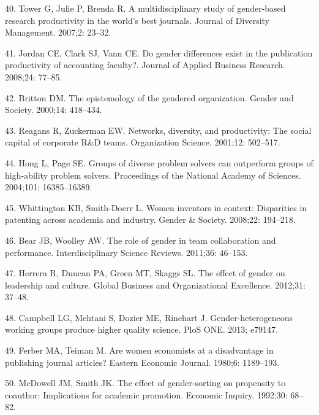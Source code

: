 \documentclass[12pt,]{article}
\begin{document}
\leavevmode\hypertarget{ref-Tower_2007}{}%
40. Tower G, Julie P, Brenda R. A multidisciplinary study of
gender-based research productivity in the world's best journals. Journal
of Diversity Management. 2007;2: 23--32.

\leavevmode\hypertarget{ref-Jordan_2008}{}%
41. Jordan CE, Clark SJ, Vann CE. Do gender differences exist in the
publication productivity of accounting faculty?. Journal of Applied
Business Research. 2008;24: 77--85.

\leavevmode\hypertarget{ref-Britton_2000}{}%
42. Britton DM. The epistemology of the gendered organization. Gender
and Society. 2000;14: 418--434.

\leavevmode\hypertarget{ref-Reagans_2001}{}%
43. Reagans R, Zuckerman EW. Networks, diversity, and productivity: The
social capital of corporate R\&D teams. Organization Science. 2001;12:
502--517.

\leavevmode\hypertarget{ref-Hong_2004}{}%
44. Hong L, Page SE. Groups of diverse problem solvers can outperform
groups of high-ability problem solvers. Proceedings of the National
Academy of Sciences. 2004;101: 16385--16389.

\leavevmode\hypertarget{ref-Whittington_2008}{}%
45. Whittington KB, Smith-Doerr L. Women inventors in context:
Disparities in patenting across academia and industry. Gender \&
Society. 2008;22: 194--218.

\leavevmode\hypertarget{ref-Bear_2011}{}%
46. Bear JB, Woolley AW. The role of gender in team collaboration and
performance. Interdisciplinary Science Reviews. 2011;36: 46--153.

\leavevmode\hypertarget{ref-Herrera_2012}{}%
47. Herrera R, Duncan PA, Green MT, Skaggs SL. The effect of gender on
leadership and culture. Global Business and Organizational Excellence.
2012;31: 37--48.

\leavevmode\hypertarget{ref-Campbell_2013}{}%
48. Campbell LG, Mehtani S, Dozier ME, Rinehart J. Gender-heterogeneous
working groups produce higher quality science. PloS ONE. 2013; e79147.

\leavevmode\hypertarget{ref-Ferber_1980}{}%
49. Ferber MA, Teiman M. Are women economists at a disadvantage in
publishing journal articles? Eastern Economic Journal. 1980;6:
1189--193.

\leavevmode\hypertarget{ref-McDowell_1992}{}%
50. McDowell JM, Smith JK. The effect of gender-sorting on propensity to
coauthor: Implications for academic promotion. Economic Inquiry.
1992;30: 68--82.
\end{document}
